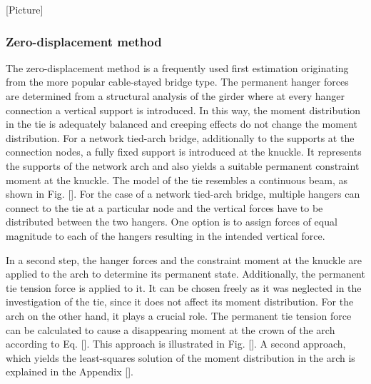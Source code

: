 [Picture]\\

\subsubsection{Zero-displacement method}
The zero-displacement method is a frequently used first estimation originating from the more popular cable-stayed bridge type. 
The permanent hanger forces are determined from a structural analysis of the girder where at every hanger connection a vertical support is introduced. In this way, the moment distribution in the tie is adequately balanced and creeping effects do not change the moment distribution. For a network tied-arch bridge, additionally to the supports at the connection nodes, a fully fixed support is introduced at the knuckle. It represents the supports of the network arch and also yields a suitable permanent constraint moment at the knuckle. The model of the tie resembles a continuous beam, as shown in Fig. []. For the case of a network tied-arch bridge, multiple hangers can connect to the tie at a particular node and the vertical forces have to be distributed between the two hangers. One option is to assign forces of equal magnitude to each of the hangers resulting in the intended vertical force. 

In a second step, the hanger forces and the constraint moment at the knuckle are applied to the arch to determine its permanent state. Additionally, the permanent tie tension force is applied to it. It can be chosen freely as it was neglected in the investigation of the tie, since it does not affect its moment distribution. For the arch on the other hand, it plays a crucial role. The permanent tie tension force can be calculated to cause a disappearing moment at the crown of the arch according to Eq. []. This approach is illustrated in Fig. []. A second approach, which yields the least-squares solution of the moment distribution in the arch is explained in the Appendix [].



